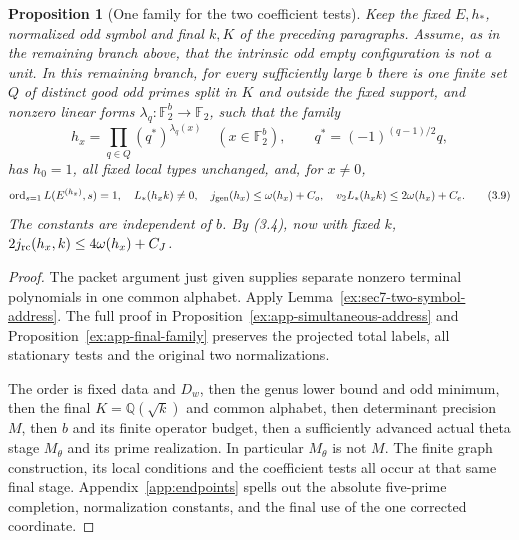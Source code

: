 \documentclass[11pt]{article}
\newtheorem{proposition}[theorem]{Proposition}
\theoremstyle{definition}
\theoremstyle{remark}
\newcommand{\Q}{\mathbb Q}
\newcommand{\F}{\mathbb F}
\newcommand{\ord}{\operatorname{ord}}
\begin{document}
\begin{proposition}[One family for the two coefficient tests]\label{ex:sec7-final-family}
Keep the fixed $E,h_*$, normalized odd symbol and final $k,K$ of the
preceding paragraphs. Assume, as in the remaining branch above,
that the intrinsic odd empty configuration is not a unit.
In this remaining branch, for every sufficiently large $b$ there is one
finite set $Q$ of distinct good odd primes split in $K$ and outside the
fixed support, and nonzero linear forms $\lambda_q:\F_2^b\to\F_2$,
such that the family
\[
 h_x=\prod_{q\in Q}(q^*)^{\lambda_q(x)}
 \quad(x\in\F_2^b),\qquad q^*=(-1)^{(q-1)/2}q,
\]
has $h_0=1$, all fixed local types unchanged, and, for $x\ne0$,
\[
 \ord_{s=1}L(E^{(h_x)},s)=1,\quad L_*(h_xk)\ne0,\quad
 j_{\rm gen}(h_x)\le\omega(h_x)+C_o,\quad
 v_2L_*(h_xk)\le2\omega(h_x)+C_e.                                \tag{3.9}
\]
The constants are independent of $b$. By (3.4), now with fixed $k$,
$2j_{\rm rc}(h_x,k)\le4\omega(h_x)+C_J$.
\end{proposition}
\begin{proof}\leavevmode
The packet argument just given supplies separate nonzero terminal
polynomials in one common alphabet. Apply
Lemma~\ref{ex:sec7-two-symbol-address}. The full proof in
Proposition~\ref{ex:app-simultaneous-address} and
Proposition~\ref{ex:app-final-family} preserves the projected total
labels, all stationary tests and the original two normalizations.

The order is fixed data and $D_w$, then the genus lower bound and odd
minimum, then the final $K=\Q(\sqrt k)$ and common alphabet, then
determinant precision $M$, then $b$ and its finite operator budget,
then a sufficiently advanced actual theta stage $M_\theta$ and its
prime realization. In particular $M_\theta$ is not $M$.
The finite graph construction, its local conditions and the coefficient
tests all occur at that same final stage. Appendix~\ref{app:endpoints}
spells out the absolute five-prime completion, normalization constants,
and the final use of the one corrected coordinate.
\end{proof}



\end{document}
